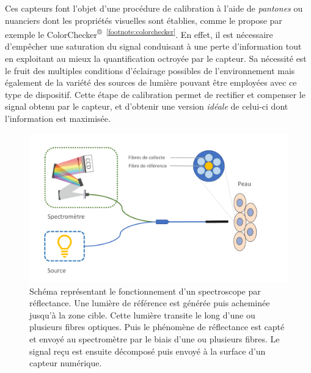 Ces capteurs font l'objet d'une procédure de calibration à l'aide de \textit{pantones} ou nuanciers dont les propriétés visuelles sont établies, comme le propose par exemple le ColorChecker\textsuperscript{®}~\textsuperscript{\ref{footnote:colorchecker}}. En effet, il est nécessaire d'empêcher une saturation du signal conduisant à une perte d'information tout en exploitant au mieux la quantification octroyée par le capteur. Sa nécessité est le fruit des multiples conditions d'éclairage possibles de l'environnement mais également de la variété des sources de lumière pouvant être employées avec ce type de dispositif. Cette étape de calibration permet de rectifier et compenser le signal obtenu par le capteur, et d'obtenir une version \textit{idéale} de celui-ci dont l'information est maximisée.\par

\begin{figure}[H]
    \centering
    \includegraphics[width=\linewidth]{contents/chapter_2/resources/scheme_principle_spectroscopy.pdf}
    \caption{Schéma représentant le fonctionnement d'un spectroscope par réflectance. Une lumière de référence est générée puis acheminée jusqu'à la zone cible. Cette lumière transite le long d'une ou plusieurs fibres optiques. Puis le phénomène de réflectance est capté et envoyé au spectromètre par le biais d'une ou plusieurs fibres. Le signal reçu est ensuite décomposé puis envoyé à la surface d'un capteur numérique.}
    \label{fig:scheme_principle_spectroscopy}
\end{figure}\par

\addtocounter{footnote}{1}


